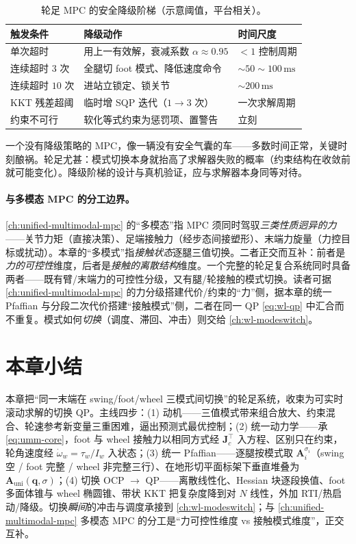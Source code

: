 \begin{table}[H]\centering\small
\caption{轮足 MPC 的安全降级阶梯（示意阈值，平台相关）。}
\label{tab:wl-degrade}
\begin{tabular}{lll}
\toprule
触发条件 & 降级动作 & 时间尺度 \\
\midrule
单次超时 & 用上一有效解，衰减系数 $\alpha\approx0.95$ & $<1$ 控制周期 \\
连续超时 $3$ 次 & 全腿切 foot 模式、降低速度命令 & $\sim50\!\sim\!100\,\mathrm{ms}$ \\
连续超时 $10$ 次 & 进站立锁定、锁关节 & $\sim200\,\mathrm{ms}$ \\
KKT 残差超阈 & 临时增 SQP 迭代（$1\!\to\!3$ 次） & 一次求解周期 \\
约束不可行 & 软化等式约束为惩罚项、置警告 & 立刻 \\
\bottomrule
\end{tabular}
\end{table}

\begin{insight}[轮足尤需降级]
一个没有降级策略的 MPC，像一辆没有安全气囊的车——多数时间正常，关键时刻酿祸。轮足尤甚：模式切换本身就抬高了求解器失败的概率（约束结构在收敛前就可能变化）。降级阶梯的设计与真机验证，应与求解器本身同等对待。
\end{insight}

\paragraph{与多模态 MPC 的分工边界。}
\cref{ch:unified-multimodal-mpc} 的“多模态”指 MPC 须同时驾驭\emph{三类性质迥异的力}——关节力矩（直接决策）、足端接触力（经步态间接塑形）、末端力旋量（力控目标或扰动）。本章的“多模式”指\emph{接触状态}逐腿三值切换。二者正交而互补：前者是\emph{力的可控性}维度，后者是\emph{接触的离散结构}维度。一个完整的轮足复合系统同时具备两者——既有臂/末端力的可控性分级，又有腿/轮接触的模式切换。读者可据 \cref{ch:unified-multimodal-mpc} 的力分级搭建代价/约束的“力”侧，据本章的统一 Pfaffian 与分段二次代价搭建“接触模式”侧，二者在同一 QP \cref{eq:wl-qp} 中汇合而不重复。模式如何\emph{切换}（调度、滞回、冲击）则交给 \cref{ch:wl-modeswitch}。

\section*{本章小结}

本章把“同一末端在 swing/foot/wheel 三模式间切换”的轮足系统，收束为可实时滚动求解的切换 QP。主线四步：(1) 动机——三值模式带来组合放大、约束混合、轮速参考新变量三重困难，逼出预测式最优控制；(2) 统一动力学——承 \cref{eq:umm-core}，foot 与 wheel 接触力以相同方式经 $\mathbf{J}_c^\top$ 入方程、区别只在约束，轮角速度经 $\dot\omega_w=\tau_w/I_w$ 入状态；(3) 统一 Pfaffian——逐腿按模式取 $\mathbf{A}_i^{\sigma_i}$（swing 空 / foot 完整 / wheel 非完整三行）、在地形切平面标架下垂直堆叠为 $\mathbf{A}_{\mathrm{uni}}(\mathbf{q},\sigma)$；(4) 切换 OCP $\to$ QP——离散线性化、Hessian 块逐段换值、foot 多面体锥与 wheel 椭圆锥、带状 KKT 把复杂度降到对 $N$ 线性，外加 RTI/热启动/降级。切换\emph{瞬间}的冲击与调度承接到 \cref{ch:wl-modeswitch}；与 \cref{ch:unified-multimodal-mpc} 多模态 MPC 的分工是“力可控性维度 vs 接触模式维度”，正交互补。

